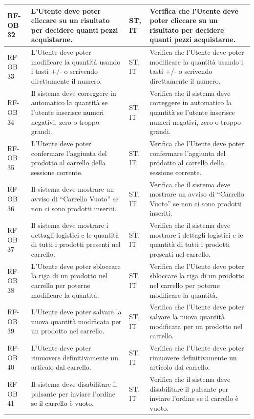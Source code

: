 \documentclass[a4paper,11pt,oneside]{scrartcl}
\begin{document}
\begin{longtable}{|p{1.5cm}|p{4.5cm}|p{1.8cm}|p{6cm}|}
RF-OB 32 & L'Utente deve poter cliccare su un risultato per decidere quanti pezzi acquistarne. & ST, IT & Verifica che l'Utente deve poter cliccare su un risultato per decidere quanti pezzi acquistarne. \\ \hline
RF-OB 33 & L'Utente deve poter modificare la quantità usando i tasti +/- o scrivendo direttamente il numero. & ST, IT & Verifica che l'Utente deve poter modificare la quantità usando i tasti +/- o scrivendo direttamente il numero. \\ \hline
RF-OB 34 & Il sistema deve correggere in automatico la quantità se l'utente inserisce numeri negativi, zero o troppo grandi. & ST, IT & Verifica che il sistema deve correggere in automatico la quantità se l'utente inserisce numeri negativi, zero o troppo grandi. \\ \hline
RF-OB 35 & L'Utente deve poter confermare l'aggiunta del prodotto al carrello della sessione corrente. & ST, IT & Verifica che l'Utente deve poter confermare l'aggiunta del prodotto al carrello della sessione corrente. \\ \hline
RF-OB 36 & Il sistema deve mostrare un avviso di ``Carrello Vuoto'' se non ci sono prodotti inseriti. & ST, IT & Verifica che il sistema deve mostrare un avviso di ``Carrello Vuoto'' se non ci sono prodotti inseriti. \\ \hline
RF-OB 37 & Il sistema deve mostrare i dettagli logistici e le quantità di tutti i prodotti presenti nel carrello. & ST, IT & Verifica che il sistema deve mostrare i dettagli logistici e le quantità di tutti i prodotti presenti nel carrello. \\ \hline
RF-OB 38 & L'Utente deve poter sbloccare la riga di un prodotto nel carrello per poterne modificare la quantità. & ST, IT & Verifica che l'Utente deve poter sbloccare la riga di un prodotto nel carrello per poterne modificare la quantità. \\ \hline
RF-OB 39 & L'Utente deve poter salvare la nuova quantità modificata per un prodotto nel carrello. & ST, IT & Verifica che l'Utente deve poter salvare la nuova quantità modificata per un prodotto nel carrello. \\ \hline
RF-OB 40 & L'Utente deve poter rimuovere definitivamente un articolo dal carrello. & ST, IT & Verifica che l'Utente deve poter rimuovere definitivamente un articolo dal carrello. \\ \hline
RF-OB 41 & Il sistema deve disabilitare il pulsante per inviare l'ordine se il carrello è vuoto. & ST, IT & Verifica che il sistema deve disabilitare il pulsante per inviare l'ordine se il carrello è vuoto. \\ \hline

\end{longtable}
\end{document}
